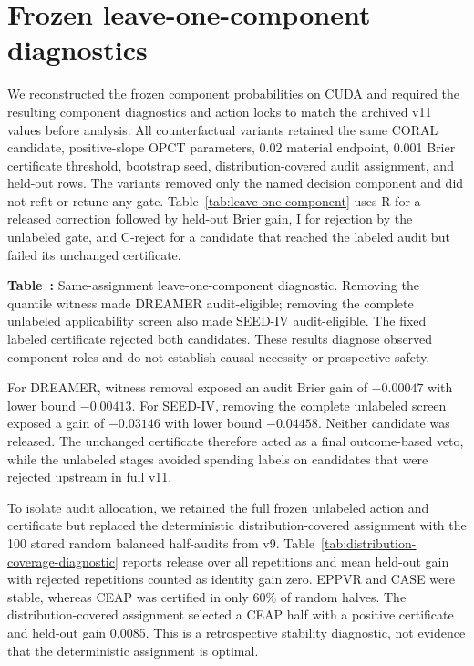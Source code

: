 \documentclass[preprint,12pt]{elsarticle}
\begin{document}
\section{Frozen leave-one-component diagnostics}

We reconstructed the frozen component probabilities on CUDA and required the resulting component diagnostics and action locks to match the archived v11 values before analysis. All counterfactual variants retained the same CORAL candidate, positive-slope OPCT parameters, 0.02 material endpoint, 0.001 Brier certificate threshold, bootstrap seed, distribution-covered audit assignment, and held-out rows. The variants removed only the named decision component and did not refit or retune any gate. Table~\ref{tab:leave-one-component} uses R for a released correction followed by held-out Brier gain, I for rejection by the unlabeled gate, and C-reject for a candidate that reached the labeled audit but failed its unchanged certificate.

\begin{center}
\begin{minipage}{\textwidth}
\textbf{Table~\thetable:} Same-assignment leave-one-component diagnostic. Removing the quantile witness made DREAMER audit-eligible; removing the complete unlabeled applicability screen also made SEED-IV audit-eligible. The fixed labeled certificate rejected both candidates. These results diagnose observed component roles and do not establish causal necessity or prospective safety.
\label{tab:leave-one-component}
\par\medskip
\centering
\small
\resizebox{\textwidth}{!}{}
\end{minipage}
\end{center}

For DREAMER, witness removal exposed an audit Brier gain of $-0.00047$ with lower bound $-0.00413$. For SEED-IV, removing the complete unlabeled screen exposed a gain of $-0.03146$ with lower bound $-0.04458$. Neither candidate was released. The unchanged certificate therefore acted as a final outcome-based veto, while the unlabeled stages avoided spending labels on candidates that were rejected upstream in full v11.

To isolate audit allocation, we retained the full frozen unlabeled action and certificate but replaced the deterministic distribution-covered assignment with the 100 stored random balanced half-audits from v9. Table~\ref{tab:distribution-coverage-diagnostic} reports release over all repetitions and mean held-out gain with rejected repetitions counted as identity gain zero. EPPVR and CASE were stable, whereas CEAP was certified in only 60\% of random halves. The distribution-covered assignment selected a CEAP half with a positive certificate and held-out gain 0.0085. This is a retrospective stability diagnostic, not evidence that the deterministic assignment is optimal.
\end{document}
